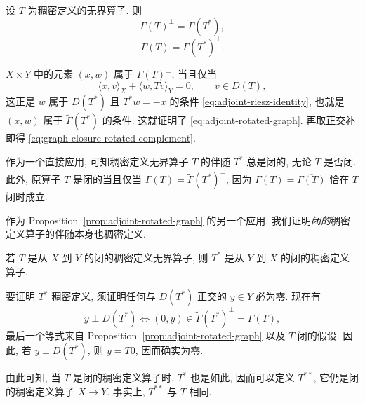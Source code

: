 \begin{Proposition}\label{prop:adjoint-rotated-graph}
{设 $T$ 为稠密定义的无界算子. 则}
\begin{equation}\label{eq:adjoint-rotated-graph}
\Gamma(T)^\perp=\widetilde\Gamma(T^*),
\end{equation}
\begin{equation}\label{eq:graph-closure-rotated-complement}
\overline{\Gamma(T)}=\widetilde\Gamma(T^*)^\perp.
\end{equation}
\end{Proposition}

\begin{Proof}
{$X\times Y$ 中的元素 $(x,w)$ 属于 $\Gamma(T)^\perp$, 当且仅当}
\[
\langle x,v\rangle_X+\langle w,Tv\rangle_Y=0,\qquad v\in D(T),
\]
{这正是 $w$ 属于 $D(T^*)$ 且 $T^*w=-x$ 的条件 \eqref{eq:adjoint-riesz-identity}, 也就是 $(x,w)$ 属于 $\widetilde\Gamma(T^*)$ 的条件. 这就证明了 \eqref{eq:adjoint-rotated-graph}. 再取正交补即得 \eqref{eq:graph-closure-rotated-complement}.}
\end{Proof}

{作为一个直接应用, 可知稠密定义无界算子 $T$ 的伴随 $T^*$ 总是闭的, 无论 $T$ 是否闭. 此外, 原算子 $T$ 是闭的当且仅当 $\Gamma(T)=\widetilde\Gamma(T^*)^\perp$, 因为 $\Gamma(T)=\overline{\Gamma(T)}$ 恰在 $T$ 闭时成立.}

{作为 Proposition~\ref{prop:adjoint-rotated-graph} 的另一个应用, 我们证明\emph{闭的}稠密定义算子的伴随本身也稠密定义.}


\begin{Proposition}\label{prop:closed-adjoint-densely-defined}
{若 $T$ 是从 $X$ 到 $Y$ 的闭的稠密定义无界算子, 则 $T^*$ 是从 $Y$ 到 $X$ 的闭的稠密定义算子.}
\end{Proposition}

\begin{Proof}
{要证明 $T^*$ 稠密定义, 须证明任何与 $D(T^*)$ 正交的 $y\in Y$ 必为零. 现在有}
\[
y\perp D(T^*)\iff(0,y)\in\widetilde\Gamma(T^*)^\perp=\Gamma(T),
\]
{最后一个等式来自 Proposition~\ref{prop:adjoint-rotated-graph} 以及 $T$ 闭的假设. 因此, 若 $y\perp D(T^*)$, 则 $y=T0$, 因而确实为零.}
\end{Proof}

{由此可知, 当 $T$ 是闭的稠密定义算子时, $T^*$ 也是如此, 因而可以定义 $T^{**}$, 它仍是闭的稠密定义算子 $X\to Y$. 事实上, $T^{**}$ 与 $T$ 相同.}

